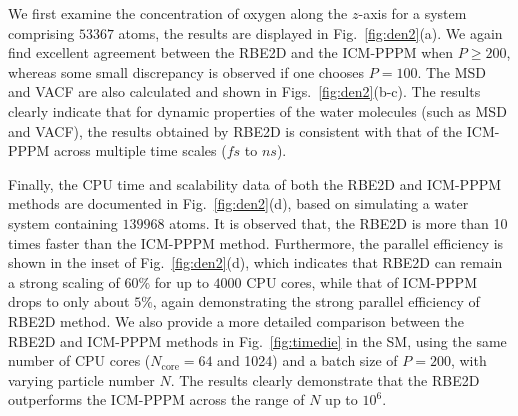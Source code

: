 We first examine the concentration of oxygen along  {the} $z$-axis for a system comprising $53367$ atoms, the results are displayed in Fig.~\ref{fig:den2}(a). 
We again find  excellent agreement between the RBE2D and the ICM-PPPM when $P\geq 200$, whereas some small discrepancy is observed if one chooses $P=100$. 
The MSD and VACF are also calculated and shown in Figs.~\ref{fig:den2}(b-c).
The results clearly indicate that for dynamic properties of the water molecules (such as MSD and VACF), the results obtained by RBE2D is consistent   {with} that of the ICM-PPPM  {across} multiple time scales ($fs$ to $ns$). 

Finally, the CPU time and scalability data of both the RBE2D and ICM-PPPM methods are documented in Fig.~\ref{fig:den2}(d), based on simulating a water system containing $139968$ atoms. It is observed that, the RBE2D is more than 10 times faster than the ICM-PPPM method. 
Furthermore, the   {parallel efficiency} is shown in the inset of Fig.~\ref{fig:den2}(d), which indicates that RBE2D can remain a strong scaling of $60\%$ for up to $4000$ CPU cores, while that of ICM-PPPM drops to only about $5\%$, again demonstrating the strong   {parallel efficiency} of RBE2D method.  {We also provide a more detailed comparison between the RBE2D and ICM-PPPM methods in Fig.~\ref{fig:timedie} in the SM, using the same number of CPU cores (\( N_{\text{core}} = 64 \) and 1024) and a batch size of \( P = 200 \), with varying particle number $N$. 
The results clearly demonstrate that the RBE2D outperforms the ICM-PPPM across the range of \( N \) up to \( 10^6 \).}